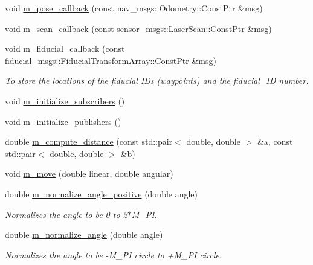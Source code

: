 \begin{DoxyCompactItemize}
\item 
void \hyperlink{class_bot___controller_acc77fd887b8ddc97431a33f3cf72e82c}{m\+\_\+pose\+\_\+callback} (const nav\+\_\+msgs\+::\+Odometry\+::\+Const\+Ptr \&msg)
\item 
void \hyperlink{class_bot___controller_ae7a0c2b3a9a5adc3464dc581003c3ce1}{m\+\_\+scan\+\_\+callback} (const sensor\+\_\+msgs\+::\+Laser\+Scan\+::\+Const\+Ptr \&msg)
\item 
void \hyperlink{class_bot___controller_affa0d8469972f97d731d72c8654a9f90}{m\+\_\+fiducial\+\_\+callback} (const fiducial\+\_\+msgs\+::\+Fiducial\+Transform\+Array\+::\+Const\+Ptr \&msg)
\begin{DoxyCompactList}\small\item\em To store the locations of the fiducial I\+Ds (waypoints) and the fiducial\+\_\+\+ID number. \end{DoxyCompactList}\item 
void \hyperlink{class_bot___controller_a90bb076f647b36f2cf5b5e57ae98ce41}{m\+\_\+initialize\+\_\+subscribers} ()
\item 
void \hyperlink{class_bot___controller_ab8d1e3dd6aced881ebcc76e32aaf0910}{m\+\_\+initialize\+\_\+publishers} ()
\item 
double \hyperlink{class_bot___controller_ac099bee38ac176cc8de6a6f78581eaa1}{m\+\_\+compute\+\_\+distance} (const std\+::pair$<$ double, double $>$ \&a, const std\+::pair$<$ double, double $>$ \&b)
\item 
void \hyperlink{class_bot___controller_a2e53992a4bdea36f745569bfe0035916}{m\+\_\+move} (double linear, double angular)
\item 
double \hyperlink{class_bot___controller_a622aa7b81b1bed82ab5478c7bd9ddd07}{m\+\_\+normalize\+\_\+angle\+\_\+positive} (double angle)
\begin{DoxyCompactList}\small\item\em Normalizes the angle to be 0 to 2$\ast$\+M\+\_\+\+PI. \end{DoxyCompactList}\item 
double \hyperlink{class_bot___controller_a234205057d0671c04b143ec5f794741c}{m\+\_\+normalize\+\_\+angle} (double angle)
\begin{DoxyCompactList}\small\item\em Normalizes the angle to be -\/\+M\+\_\+\+PI circle to +\+M\+\_\+\+PI circle. \end{DoxyCompactList}\end{DoxyCompactItemize}
